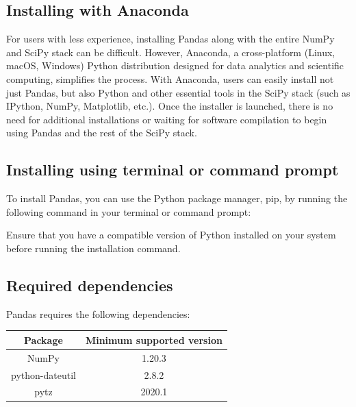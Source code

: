 \subsection{Installing with Anaconda}

For users with less experience, installing Pandas along with the entire NumPy and SciPy stack can be difficult. However, Anaconda, a cross-platform (Linux, macOS, Windows) Python distribution designed for data analytics and scientific computing, simplifies the process. With Anaconda, users can easily install not just Pandas, but also Python and other essential tools in the SciPy stack (such as IPython, NumPy, Matplotlib, etc.). Once the installer is launched, there is no need for additional installations or waiting for software compilation to begin using Pandas and the rest of the SciPy stack.


\subsection{Installing using terminal or command prompt}

To install Pandas, you can use the Python package manager, pip, by running the following command in your terminal or command prompt:

\begin{code}[h!]
	    
	
	\caption{Installing Pandas using terminal}
	
\end{code}	

Ensure that you have a compatible version of Python installed on your system before running the installation command.

\subsection{Required dependencies}

Pandas requires the following dependencies:

\begin{center}
	\begin{tabular}{ |c|c| }
		\hline
		Package & Minimum supported version \\
		\hline
		NumPy & 1.20.3 \\
		python-dateutil & 2.8.2 \\
		pytz & 2020.1 \\
		\hline
	\end{tabular}
\end{center}

